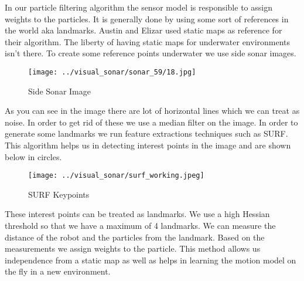 In our particle filtering algorithm the sensor model is responsible to assign weights to the particles. It is generally done by using some sort of references in the world aka landmarks. Austin and Elizar used static maps as reference for their algorithm. The liberty of having static maps for underwater environments isn't there. To create some reference points underwater we use side sonar images.
\begin{figure}[hbtp]
\caption{Side Sonar Image}
\centering
\texttt{[image: ../visual\_sonar/sonar\_59/18.jpg]}
\end{figure}

As you can see in the image there are lot of horizontal lines which we can treat as noise. In order to get rid of  these we use a median filter on the image. In order to generate some landmarks we run feature extractions techniques such as SURF. This algorithm helps us in detecting interest points in the image and are shown below in circles. 
\begin{figure}[hbtp]
\caption{SURF Keypoints}
\centering
\texttt{[image: ../visual\_sonar/surf\_working.jpeg]}
\end{figure}

These interest points can be treated as landmarks. We use a high Hessian
threshold so that we have a maximum of 4 landmarks. We can measure
the distance of the robot and the particles from the landmark. Based
on the measurements we assign weights to the particle. This method
allows us independence from a static map as well as helps in learning
the motion model on the fly in a new environment. 